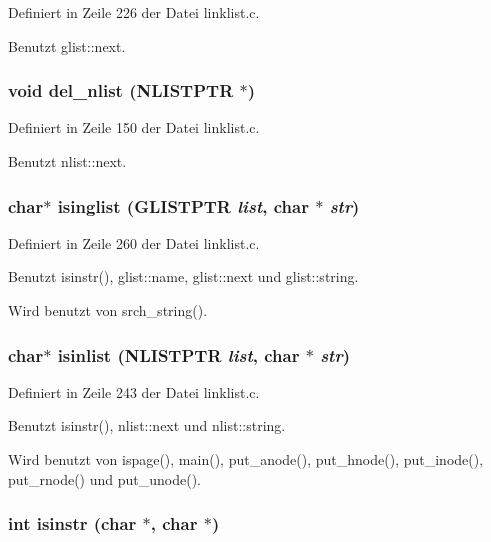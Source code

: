 Definiert in Zeile 226 der Datei linklist.c.

Benutzt glist::next.
\subsubsection{\setlength{\rightskip}{0pt plus 5cm}void del\_\-nlist ({\bf NLISTPTR} $\ast$)}\label{linklist_8c_949ae6c82d1c88d8407757f05724d8af}




Definiert in Zeile 150 der Datei linklist.c.

Benutzt nlist::next.
\subsubsection{\setlength{\rightskip}{0pt plus 5cm}char$\ast$ isinglist ({\bf GLISTPTR} {\em list}, char $\ast$ {\em str})}\label{linklist_8c_70d3ef92faca75f6392ba919975ffe47}




Definiert in Zeile 260 der Datei linklist.c.

Benutzt isinstr(), glist::name, glist::next und glist::string.

Wird benutzt von srch\_\-string().
\subsubsection{\setlength{\rightskip}{0pt plus 5cm}char$\ast$ isinlist ({\bf NLISTPTR} {\em list}, char $\ast$ {\em str})}\label{linklist_8c_29bda5ebb6dd2f9b19d8f9519eaf94ff}




Definiert in Zeile 243 der Datei linklist.c.

Benutzt isinstr(), nlist::next und nlist::string.

Wird benutzt von ispage(), main(), put\_\-anode(), put\_\-hnode(), put\_\-inode(), put\_\-rnode() und put\_\-unode().
\subsubsection{\setlength{\rightskip}{0pt plus 5cm}int isinstr (char $\ast$, char $\ast$)}\label{linklist_8c_99ef4b81dcab23e1497ea7d5afdeceeb}




